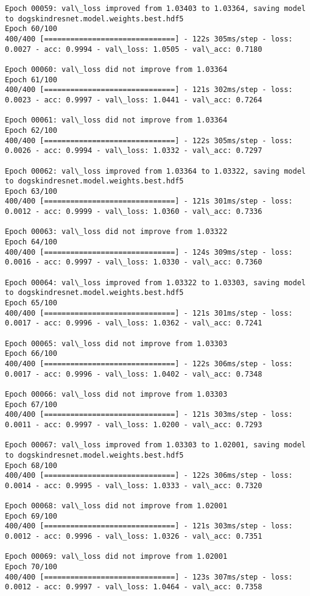 \documentclass[11pt]{article}
\begin{document}
\begin{Verbatim}[commandchars=\\\{\}]
Epoch 00059: val\_loss improved from 1.03403 to 1.03364, saving model to dogskindresnet.model.weights.best.hdf5
Epoch 60/100
400/400 [==============================] - 122s 305ms/step - loss: 0.0027 - acc: 0.9994 - val\_loss: 1.0505 - val\_acc: 0.7180

Epoch 00060: val\_loss did not improve from 1.03364
Epoch 61/100
400/400 [==============================] - 121s 302ms/step - loss: 0.0023 - acc: 0.9997 - val\_loss: 1.0441 - val\_acc: 0.7264

Epoch 00061: val\_loss did not improve from 1.03364
Epoch 62/100
400/400 [==============================] - 122s 305ms/step - loss: 0.0026 - acc: 0.9994 - val\_loss: 1.0332 - val\_acc: 0.7297

Epoch 00062: val\_loss improved from 1.03364 to 1.03322, saving model to dogskindresnet.model.weights.best.hdf5
Epoch 63/100
400/400 [==============================] - 121s 301ms/step - loss: 0.0012 - acc: 0.9999 - val\_loss: 1.0360 - val\_acc: 0.7336

Epoch 00063: val\_loss did not improve from 1.03322
Epoch 64/100
400/400 [==============================] - 124s 309ms/step - loss: 0.0016 - acc: 0.9997 - val\_loss: 1.0330 - val\_acc: 0.7360

Epoch 00064: val\_loss improved from 1.03322 to 1.03303, saving model to dogskindresnet.model.weights.best.hdf5
Epoch 65/100
400/400 [==============================] - 121s 301ms/step - loss: 0.0017 - acc: 0.9996 - val\_loss: 1.0362 - val\_acc: 0.7241

Epoch 00065: val\_loss did not improve from 1.03303
Epoch 66/100
400/400 [==============================] - 122s 306ms/step - loss: 0.0017 - acc: 0.9996 - val\_loss: 1.0402 - val\_acc: 0.7348

Epoch 00066: val\_loss did not improve from 1.03303
Epoch 67/100
400/400 [==============================] - 121s 303ms/step - loss: 0.0011 - acc: 0.9997 - val\_loss: 1.0200 - val\_acc: 0.7293

Epoch 00067: val\_loss improved from 1.03303 to 1.02001, saving model to dogskindresnet.model.weights.best.hdf5
Epoch 68/100
400/400 [==============================] - 122s 306ms/step - loss: 0.0014 - acc: 0.9995 - val\_loss: 1.0333 - val\_acc: 0.7320

Epoch 00068: val\_loss did not improve from 1.02001
Epoch 69/100
400/400 [==============================] - 121s 303ms/step - loss: 0.0012 - acc: 0.9996 - val\_loss: 1.0326 - val\_acc: 0.7351

Epoch 00069: val\_loss did not improve from 1.02001
Epoch 70/100
400/400 [==============================] - 123s 307ms/step - loss: 0.0012 - acc: 0.9997 - val\_loss: 1.0464 - val\_acc: 0.7358


\end{Verbatim}
\end{document}
